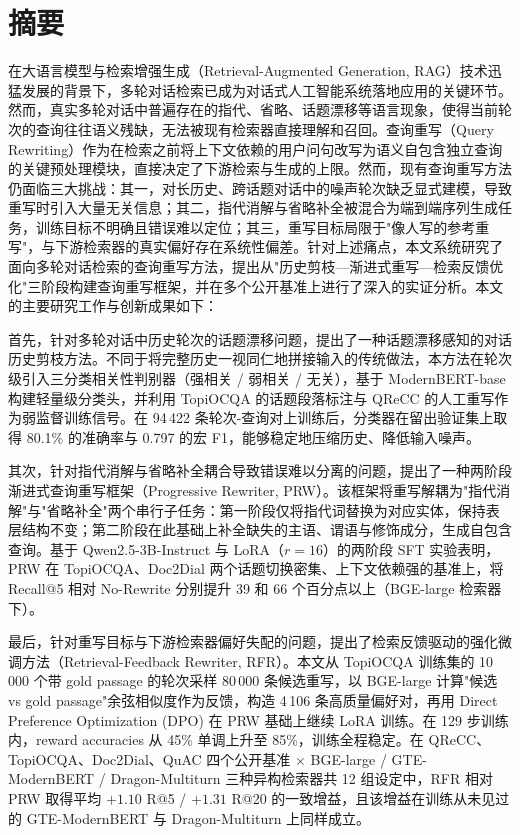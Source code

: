 \chapter{摘\quad 要}
\linespread{1.5}

在大语言模型与检索增强生成（Retrieval-Augmented Generation, RAG）技术迅猛发展的背景下，多轮对话检索已成为对话式人工智能系统落地应用的关键环节。然而，真实多轮对话中普遍存在的指代、省略、话题漂移等语言现象，使得当前轮次的查询往往语义残缺，无法被现有检索器直接理解和召回。查询重写（Query Rewriting）作为在检索之前将上下文依赖的用户问句改写为语义自包含独立查询的关键预处理模块，直接决定了下游检索与生成的上限。然而，现有查询重写方法仍面临三大挑战：其一，对长历史、跨话题对话中的噪声轮次缺乏显式建模，导致重写时引入大量无关信息；其二，指代消解与省略补全被混合为端到端序列生成任务，训练目标不明确且错误难以定位；其三，重写目标局限于"像人写的参考重写"，与下游检索器的真实偏好存在系统性偏差。针对上述痛点，本文系统研究了面向多轮对话检索的查询重写方法，提出从"历史剪枝—渐进式重写—检索反馈优化"三阶段构建查询重写框架，并在多个公开基准上进行了深入的实证分析。本文的主要研究工作与创新成果如下：

首先，针对多轮对话中历史轮次的话题漂移问题，提出了一种话题漂移感知的对话历史剪枝方法。不同于将完整历史一视同仁地拼接输入的传统做法，本方法在轮次级引入三分类相关性判别器（强相关 / 弱相关 / 无关），基于 ModernBERT-base 构建轻量级分类头，并利用 TopiOCQA 的话题段落标注与 QReCC 的人工重写作为弱监督训练信号。在 94\,422 条轮次-查询对上训练后，分类器在留出验证集上取得 80.1\% 的准确率与 0.797 的宏 F1，能够稳定地压缩历史、降低输入噪声。

其次，针对指代消解与省略补全耦合导致错误难以分离的问题，提出了一种两阶段渐进式查询重写框架（Progressive Rewriter, PRW）。该框架将重写解耦为"指代消解"与"省略补全"两个串行子任务：第一阶段仅将指代词替换为对应实体，保持表层结构不变；第二阶段在此基础上补全缺失的主语、谓语与修饰成分，生成自包含查询。基于 Qwen2.5-3B-Instruct 与 LoRA（$r{=}16$）的两阶段 SFT 实验表明，PRW 在 TopiOCQA、Doc2Dial 两个话题切换密集、上下文依赖强的基准上，将 Recall@5 相对 No-Rewrite 分别提升 39 和 66 个百分点以上（BGE-large 检索器下）。

最后，针对重写目标与下游检索器偏好失配的问题，提出了检索反馈驱动的强化微调方法（Retrieval-Feedback Rewriter, RFR）。本文从 TopiOCQA 训练集的 10\,000 个带 gold passage 的轮次采样 80\,000 条候选重写，以 BGE-large 计算"候选 vs gold passage"余弦相似度作为反馈，构造 4\,106 条高质量偏好对，再用 Direct Preference Optimization (DPO) 在 PRW 基础上继续 LoRA 训练。在 129 步训练内，reward accuracies 从 45\% 单调上升至 85\%，训练全程稳定。在 QReCC、TopiOCQA、Doc2Dial、QuAC 四个公开基准 $\times$ BGE-large / GTE-ModernBERT / Dragon-Multiturn 三种异构检索器共 12 组设定中，RFR 相对 PRW 取得平均 $+1.10$ R@5 / $+1.31$ R@20 的一致增益，且该增益在训练从未见过的 GTE-ModernBERT 与 Dragon-Multiturn 上同样成立。

